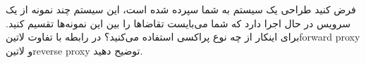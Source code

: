 
فرض کنید طراحی یک سیستم به شما سپرده شده است، این سیستم چند نمونه از یک سرویس در حال اجرا دارد که شما می‌بایست تقاضاها را بین این نمونه‌ها تقسیم کنید. برای اینکار از چه نوع پراکسی استفاده می‌کنید؟
در رابطه با تفاوت ‌لاتین{forward proxy} و ‌لاتین{reverse proxy} توضیح دهید.


